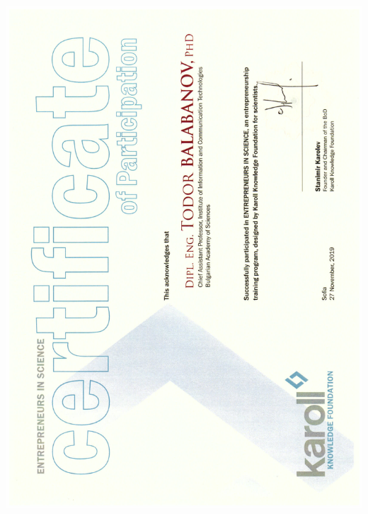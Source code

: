 \documentclass[bulgarian,a4paper]{europasscv}
\begin{document}
\includegraphics[width=\textwidth,height=\textheight,keepaspectratio]{Karoll2019}
\end{document}
